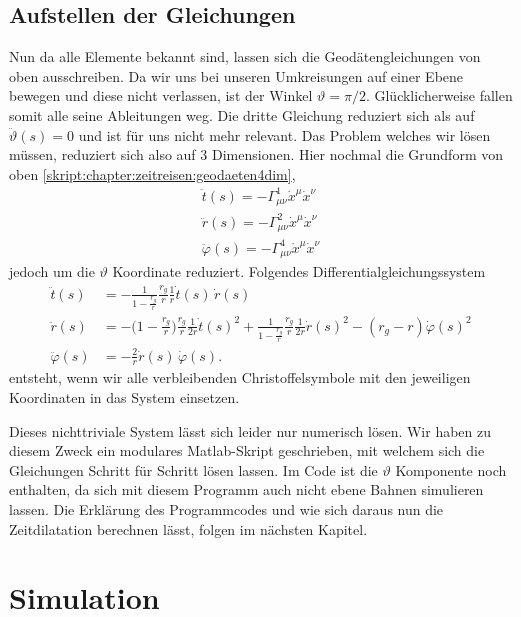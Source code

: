 \begin{refsection}
	
	\subsection{Aufstellen der Gleichungen}
	
	Nun da alle Elemente bekannt sind, lassen sich die Geodätengleichungen  von oben ausschreiben. Da wir uns bei unseren Umkreisungen auf einer Ebene bewegen und diese nicht verlassen, ist der Winkel $\vartheta = \pi/2$. Glücklicherweise fallen somit alle seine Ableitungen weg. Die dritte Gleichung reduziert sich als auf $\ddot{\vartheta}(s)=0$ und ist für uns nicht mehr relevant. Das Problem welches wir lösen müssen, reduziert sich also auf 3 Dimensionen. Hier nochmal die Grundform von oben \eqref{skript:chapter:zeitreisen:geodaeten4dim},
	\begin{align*}
	\ddot{t}(s) = -\Gamma^{1}_{\mu\nu}\dot{x}^{\mu}\dot{x}^{\nu}\\
	\ddot{r}(s) = -\Gamma^{2}_{\mu\nu}\dot{x}^{\mu}\dot{x}^{\nu}\\
	\ddot{\varphi}(s) = -\Gamma^{4}_{\mu\nu}\dot{x}^{\mu}\dot{x}^{\nu}		
	\end{align*} 
 	jedoch um die $\vartheta$ Koordinate reduziert.
	Folgendes Differentialgleichungssystem
	\begin{equation}\label{finaleq}
	\begin{aligned}
	\ddot t(s)
	&=
	-\frac{1}{1-\displaystyle\frac{r_g}{r}}\frac{r_g}{r}\frac{1}{r}\dot t(s)\,\dot r(s)
	\\
	\ddot r(s)
	&=
	-\biggl(1-\frac{r_g}{r}\biggr)\frac{r_g}{r}\frac1{2r}\dot t(s)^2
	+\frac{1}{1-\displaystyle\frac{r_g}{r}} \frac{r_g}{r}\frac1{2r}\dot r(s)^2
	- (r_g-r) \dot\varphi(s)^2
	\\
	\ddot \varphi(s)
	&=
	-\frac2r \dot r(s)\,\dot\varphi(s).
	\end{aligned}
	\end{equation}
	entsteht, wenn wir alle verbleibenden Christoffelsymbole mit den jeweiligen Koordinaten in das System einsetzen.
	
	Dieses nichttriviale System lässt sich leider nur numerisch lösen. Wir haben zu diesem Zweck ein modulares Matlab-Skript geschrieben, mit welchem sich die Gleichungen Schritt für Schritt lösen lassen. Im Code ist die $\vartheta$ Komponente noch enthalten, da sich mit diesem Programm auch nicht ebene Bahnen simulieren lassen. Die Erklärung des Programmcodes und wie sich daraus nun die Zeitdilatation berechnen lässt, folgen im nächsten Kapitel.
		
	\section{Simulation}
		

\end{refsection}
